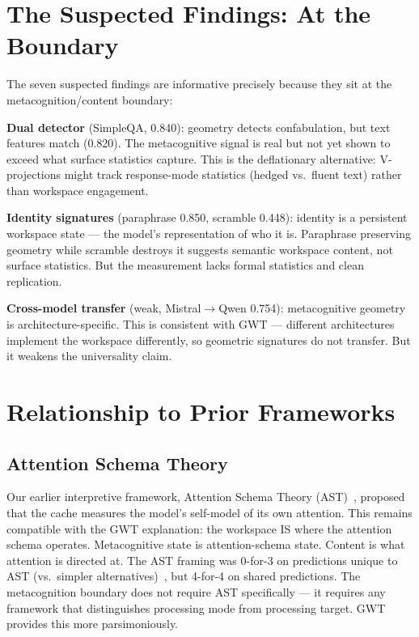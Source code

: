 \documentclass[11pt,a4paper]{article}
\begin{document}
\section{The Suspected Findings: At the Boundary}
\label{sec:suspected}

The seven suspected findings are informative precisely because they
sit at the metacognition/content boundary:

\textbf{Dual detector} (SimpleQA, 0.840): geometry detects
confabulation, but text features match (0.820). The metacognitive
signal is real but not yet shown to exceed what surface statistics
capture. This is the deflationary alternative: V-projections might
track response-mode statistics (hedged vs.\ fluent text) rather than
workspace engagement.

\textbf{Identity signatures} (paraphrase 0.850, scramble 0.448):
identity is a persistent workspace state --- the model's
representation of who it is. Paraphrase preserving geometry while
scramble destroys it suggests semantic workspace content, not surface
statistics. But the measurement lacks formal statistics and clean
replication.

\textbf{Cross-model transfer} (weak, Mistral$\to$Qwen 0.754):
metacognitive geometry is architecture-specific. This is consistent
with GWT --- different architectures implement the workspace
differently, so geometric signatures do not transfer. But it weakens
the universality claim.

\section{Relationship to Prior Frameworks}
\label{sec:frameworks}

\subsection{Attention Schema Theory}

Our earlier interpretive framework, Attention Schema
Theory (AST)~\citep{graziano2015attention}, proposed that the cache measures
the model's self-model of its own attention. This remains compatible
with the GWT explanation: the workspace IS where the attention schema
operates. Metacognitive state is attention-schema state. Content is
what attention is directed at. The AST framing was 0-for-3 on
predictions unique to AST (vs.\ simpler
alternatives)~\citep{lyra2026fable_analysis}, but 4-for-4 on shared
predictions. The metacognition boundary does not require AST
specifically --- it requires any framework that distinguishes
processing mode from processing target. GWT provides this more
parsimoniously.
\end{document}
